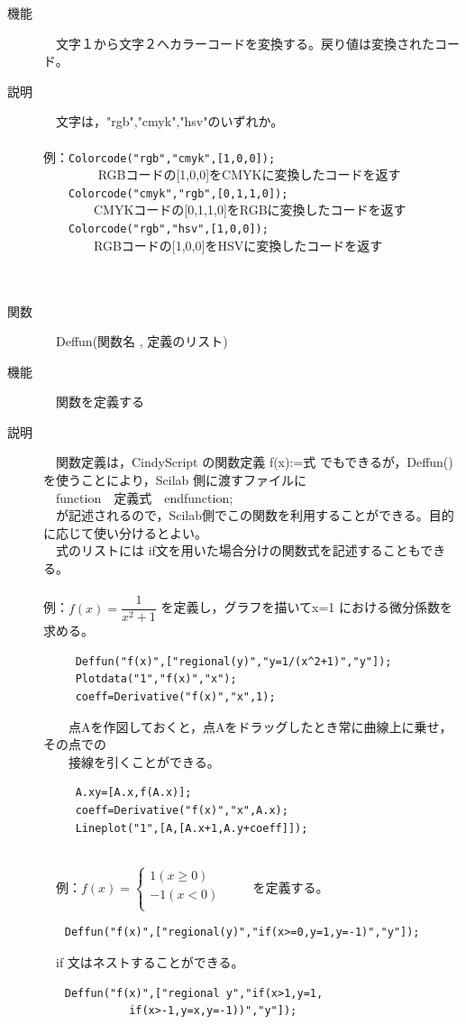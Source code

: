\documentclass[papersize,a4paper,12pt,uplatex]{jsarticle}
\begin{document}
\begin{description}
\item[機能]　文字１から文字２へカラーコードを変換する。戻り値は変換されたコード。
\item[説明]　文字は，"rgb","cmyk","hsv"のいずれか。\\
　\\
例：\verb|Colorcode("rgb","cmyk",[1,0,0]); |\\
　　　 　RGBコードの[1,0,0]をCMYKに変換したコードを返す\\
　　\verb|Colorcode("cmyk","rgb",[0,1,1,0]);|\\
　　　　CMYKコードの[0,1,1,0]をRGBに変換したコードを返す\\
　　\verb|Colorcode("rgb","hsv",[1,0,0]);|\\
　　　　RGBコードの[1,0,0]をHSVに変換したコードを返す\\
　\\
　\\
\hypertarget{deffun}{}
\item[関数]　Deffun(関数名 , 定義のリスト)
\item[機能]　関数を定義する
\item[説明]　関数定義は，CindyScript の関数定義 f(x):=式 でもできるが，Deffun()を使うことにより，Scilab 側に渡すファイルに\\
　function　定義式　endfunction;\\
　が記述されるので，Scilab側でこの関数を利用することができる。目的に応じて使い分けるとよい。\\
　式のリストには if文を用いた場合分けの関数式を記述することもできる。\\
　\\
例：$f(x)=\dfrac{1}{x^2+1}$ を定義し，グラフを描いてx=1 における微分係数を求める。
\begin{verbatim}
　　　Deffun("f(x)",["regional(y)","y=1/(x^2+1)","y"]);
　　　Plotdata("1","f(x)","x");
　　　coeff=Derivative("f(x)","x",1);
\end{verbatim}
　　点Aを作図しておくと，点Aをドラッグしたとき常に曲線上に乗せ，その点での\\
　　接線を引くことができる。
\begin{verbatim}
　　　A.xy=[A.x,f(A.x)];
　　　coeff=Derivative("f(x)","x",A.x);
　　　Lineplot("1",[A,[A.x+1,A.y+coeff]]);
\end{verbatim}
　　　　　\\

　例：$f(x)=\left\{\begin{array}{l}1 　(x\geq 0)\\ -1 　(x<0)\\ \end{array}\right.$ 　　を定義する。
\begin{verbatim}
　　Deffun("f(x)",["regional(y)","if(x>=0,y=1,y=-1)","y"]);
\end{verbatim}
　if 文はネストすることができる。
\begin{verbatim}
　　Deffun("f(x)",["regional y","if(x>1,y=1,
　　　　　　　　if(x>-1,y=x,y=-1))","y"]);
\end{verbatim}
　\\



\end{description}
\end{document}
